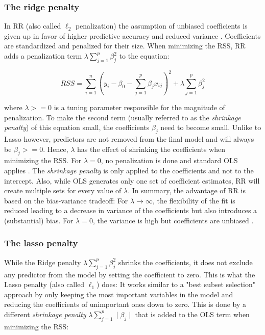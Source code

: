 \documentclass[review]{elsarticle}
\begin{document}
\subsubsection{The ridge penalty}

In \ac{RR} (also called $\ell_{2}$ penalization) the assumption of unbiased coefficients is given up in favor of higher predictive accuracy and reduced variance \citep{Hastie2001}.
Coefficients are standardized and penalized for their size.
When minimizing the \ac{RSS}, \ac{RR} adds a penalization term $\lambda \sum_{j=1}^{p}\beta_{j}^{2}$ to the equation:

\begin{equation}
	RSS = \sum_{i=1}^{n} \left(y_{i} - \beta_{0} - \sum_{j=1}^{p} \beta_{j} x_{ij} \right) ^{2} + \lambda \sum_{j=1}^{p}\beta_{j}^{2}
\end{equation}

where $\lambda >= 0$ is a tuning parameter responsible for the magnitude of penalization.
To make the second term (usually referred to as the \textit{shrinkage penalty}) of this equation small, the coefficients $\beta_{j}$ need to become small.
Unlike to Lasso however, predictors are not removed from the final model and will always be $\beta_{j} >= 0$.
Hence, $\lambda$ has the effect of shrinking the coefficients when minimizing the \ac{RSS}.
For $\lambda = 0$, no penalization is done and standard \ac{OLS} applies \citep{James2013}.
The \textit{shrinkage penalty} is only applied to the coefficients and not to the intercept.
Also, while \ac{OLS} generates only one set of coefficient estimates, \ac{RR} will create multiple sets for every value of $\lambda$.
In summary, the advantage of \ac{RR} is based on the bias-variance tradeoff: For $\lambda\to\infty$, the flexibility of the fit is reduced leading to a decrease in variance of the coefficients but also introduces a (substantial) bias.
For $\lambda = 0$, the variance is high but coefficients are unbiased \citep{James2013}.

\subsubsection{The lasso penalty}

While the Ridge penalty $\lambda \sum_{j=1}^{p}\beta_{j}^{2}$ shrinks the coefficients, it does not exclude any predictor from the model by setting the coefficient to zero.
This is what the Lasso penalty (also called $\ell_{1}$) does: It works similar to a "best subset selection" approach by only keeping the most important variables in the model and reducing the coefficients of unimportant ones down to zero.
This is done by a different \textit{shrinkage penalty} $\lambda \sum_{j=1}^{p} \mid\beta_{j}\mid$ that is added to the \ac{OLS} term when minimizing the \ac{RSS}:
\end{document}
